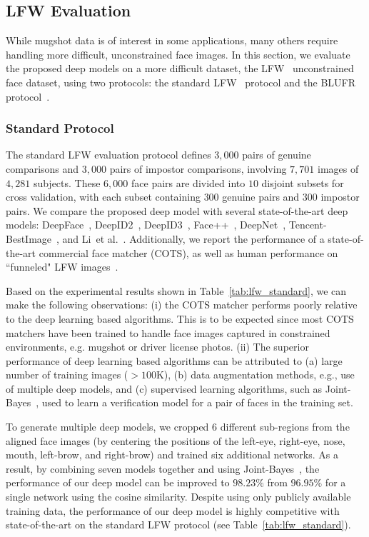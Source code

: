 \documentclass[10pt,journal,compsoc]{IEEEtran}
\newcommand{\etal}{et al.}
\begin{document}
\subsection{LFW Evaluation}
While mugshot data is of interest in some applications, many others require handling more difficult, unconstrained face images. In this section, we evaluate the proposed deep models on a more difficult dataset, the  LFW~\cite{DB:LFWTech} unconstrained face dataset, using two protocols: the standard LFW~\cite{DB:LFWTech} protocol and the BLUFR protocol~\cite{BLUFR}.

\subsubsection{Standard Protocol}\label{sec:lfw_protocol}
The standard LFW evaluation protocol defines $3,000$ pairs of genuine comparisons and $3,000$ pairs of impostor comparisons, involving $7,701$ images of $4,281$ subjects. These $6,000$ face pairs are divided into $10$ disjoint subsets for cross validation, with each subset containing $300$ genuine pairs and $300$ impostor pairs. We compare the proposed deep model with several state-of-the-art deep models: DeepFace~\cite{dl:deepface}, DeepID2~\cite{dl:deepID2}, DeepID3~\cite{dl:deepID3}, Face++~\cite{dl:face++}, DeepNet~\cite{dl:facenet}, Tencent-BestImage~\cite{dl:tencent}, and Li~\etal~\cite{DB:CASIA}. Additionally, we report the performance of a state-of-the-art commercial face matcher (COTS), as well as human performance on ``funneled" LFW images~\cite{align:funnel}.

Based on the experimental results shown in Table~\ref{tab:lfw_standard}, we can make the following observations: (i) the COTS matcher performs poorly relative to the deep learning based algorithms. This is to be expected since most COTS matchers have been trained to handle face images captured in constrained environments, e.g. mugshot or driver license photos. (ii) The superior performance of deep learning based algorithms can be attributed to (a) large number of training images ($> 100$K), (b) data augmentation methods, e.g., use of multiple deep models, and (c) supervised learning algorithms, such as Joint-Bayes~\cite{ml:jointbayes}, used to learn a verification model for a pair of faces in the training set.

To generate multiple deep models, we cropped $6$ different sub-regions from the aligned face images (by centering the positions of the left-eye, right-eye, nose, mouth, left-brow, and right-brow) and trained six additional networks. As a result, by combining seven models together and using Joint-Bayes~\cite{ml:jointbayes}, the performance of our deep model can be improved to $98.23\%$ from $96.95\%$ for a single network using the cosine similarity. Despite using only publicly available training data, the performance of our deep model is highly competitive with state-of-the-art on the standard LFW protocol (see Table~\ref{tab:lfw_standard}).
\end{document}
